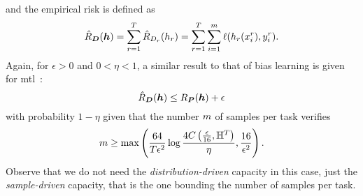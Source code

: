 and the empirical risk is defined as
\begin{equation}\label{eq:mtlearn_emprisk}
    \bemprisk(\myvec{\hypf}) = \sum_{r=1}^\ntasks \hat{\risk}_{\sample_r}(\hypf_r) = \sum_{r=1}^\ntasks \sum_{i=1}^m \lossf(\hypf_r(x_i^r), y_i^r).
\end{equation}
Again, for $\epsilon > 0$ and $0 < \eta < 1$, a similar result to that of bias learning is given for \acrshort{mtl}~\cite[Theorem~4]{baxter2000model}:
\begin{equation}
    \nonumber
    \hat{R}_{\bm{D}}(\bm{h}) \leq R_{\bm{P}}(\bm{h}) + \epsilon
\end{equation}
with probability $1 - \eta$ given that the number $m$ of samples per task verifies
\begin{equation}
    \nonumber
    m \geq \max \left( \frac{64}{T \epsilon^2} \log\frac{4C\left(\frac{\epsilon}{16}, \mathbb{H}^{T}\right)}{\eta} , \frac{16}{\epsilon^2}\right).
\end{equation}
Observe that we do not need the \emph{distribution-driven} capacity in this case, just the \emph{sample-driven} capacity, that is the one bounding the number of samples per task.


